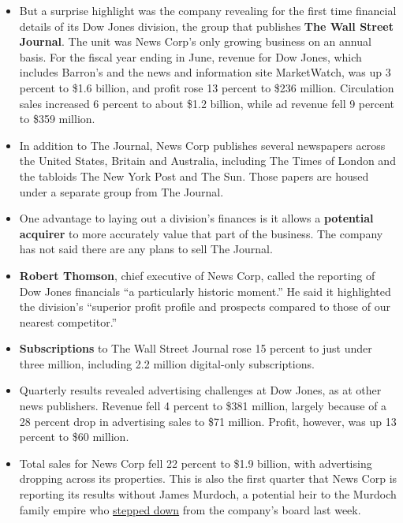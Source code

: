 \begin{itemize}
\item
  But a surprise highlight was the company revealing for the first time
  financial details of its Dow Jones division, the group that publishes
  \textbf{The Wall Street Journal}. The unit was News Corp's only
  growing business on an annual basis. For the fiscal year ending in
  June, revenue for Dow Jones, which includes Barron's and the news and
  information site MarketWatch, was up 3 percent to \$1.6 billion, and
  profit rose 13 percent to \$236 million. Circulation sales increased 6
  percent to about \$1.2 billion, while ad revenue fell 9 percent to
  \$359 million.
\item
  In addition to The Journal, News Corp publishes several newspapers
  across the United States, Britain and Australia, including The Times
  of London and the tabloids The New York Post and The Sun. Those papers
  are housed under a separate group from The Journal.
\item
  One advantage to laying out a division's finances is it allows a
  \textbf{potential acquirer} to more accurately value that part of the
  business. The company has not said there are any plans to sell The
  Journal.
\item
  \textbf{Robert Thomson}, chief executive of News Corp, called the
  reporting of Dow Jones financials ``a particularly historic moment.''
  He said it highlighted the division's ``superior profit profile and
  prospects compared to those of our nearest competitor.''
\item
  \textbf{Subscriptions} to The Wall Street Journal rose 15 percent to
  just under three million, including 2.2 million digital-only
  subscriptions.
\item
  Quarterly results revealed advertising challenges at Dow Jones, as at
  other news publishers. Revenue fell 4 percent to \$381 million,
  largely because of a 28 percent drop in advertising sales to \$71
  million. Profit, however, was up 13 percent to \$60 million.
\item
  Total sales for News Corp fell 22 percent to \$1.9 billion, with
  advertising dropping across its properties. This is also the first
  quarter that News Corp is reporting its results without James Murdoch,
  a potential heir to the Murdoch family empire who
  \href{https://www.nytimes3xbfgragh.onion/2020/07/31/business/media/james-murdoch-resigns-news-corp.html}{stepped
  down} from the company's board last week.
\end{itemize}

